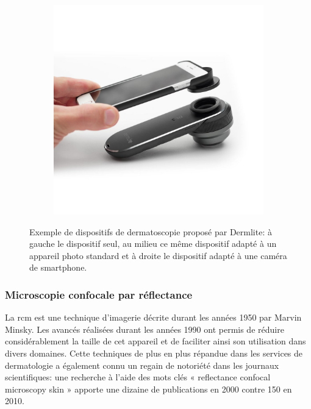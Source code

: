 \begin{figure}[H]
\begin{subfigure}{.33\textwidth}
    \end{subfigure}
    \begin{subfigure}{.33\textwidth}
      \centering
      \includegraphics[width=\linewidth]{contents/chapter_2/resources/dermatoscope_example_3.png}
    \end{subfigure}
    \caption{Exemple de dispositifs de dermatoscopie proposé par Dermlite: à gauche le dispositif seul, au milieu ce même dispositif adapté à un appareil photo standard et à droite le dispositif adapté à une caméra de smartphone.}
    \label{fig:dermatoscope_example}
\end{figure}\par

\subsubsection{Microscopie confocale par réflectance}
La \gls{rcm} est une technique d’imagerie décrite durant les années 1950 par Marvin Minsky. Les avancés réalisées durant les années 1990 ont permis de réduire considérablement la taille de cet appareil et de faciliter ainsi son utilisation dans divers domaines. Cette techniques de plus en plus répandue dans les services de dermatologie a également connu un regain de notoriété dans les journaux scientifiques: une recherche à l’aide des mots clés « reflectance confocal microscopy skin » apporte une dizaine de publications en 2000 contre 150 en 2010.\par

